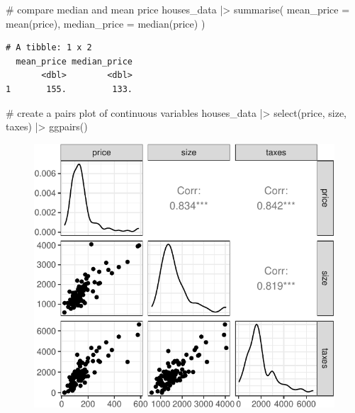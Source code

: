 \documentclass[
  11pt,
  letterpaper,
  oneside]{book}
\newenvironment{Shaded}{\begin{snugshade}}{\end{snugshade}}
\newcommand{\AttributeTok}[1]{\textcolor[rgb]{0.40,0.45,0.13}{#1}}
\newcommand{\CommentTok}[1]{\textcolor[rgb]{0.37,0.37,0.37}{#1}}
\newcommand{\FunctionTok}[1]{\textcolor[rgb]{0.28,0.35,0.67}{#1}}
\newcommand{\NormalTok}[1]{\textcolor[rgb]{0.00,0.23,0.31}{#1}}
\newcommand{\SpecialCharTok}[1]{\textcolor[rgb]{0.37,0.37,0.37}{#1}}
\theoremstyle{definition}
\theoremstyle{plain}
\theoremstyle{plain}
\theoremstyle{plain}
\theoremstyle{remark}
\begin{document}
\begin{Shaded}
\begin{Highlighting}[]
\CommentTok{\# compare median and mean price}
\NormalTok{houses\_data }\SpecialCharTok{|\textgreater{}}
  \FunctionTok{summarise}\NormalTok{(}
    \AttributeTok{mean\_price =} \FunctionTok{mean}\NormalTok{(price),}
    \AttributeTok{median\_price =} \FunctionTok{median}\NormalTok{(price)}
\NormalTok{  )}
\end{Highlighting}
\end{Shaded}

\begin{verbatim}
# A tibble: 1 x 2
  mean_price median_price
       <dbl>        <dbl>
1       155.         133.
\end{verbatim}

\begin{Shaded}
\begin{Highlighting}[]
\CommentTok{\# create a pairs plot of continuous variables}
\NormalTok{houses\_data }\SpecialCharTok{|\textgreater{}}
  \FunctionTok{select}\NormalTok{(price, size, taxes) }\SpecialCharTok{|\textgreater{}}
  \FunctionTok{ggpairs}\NormalTok{()}
\end{Highlighting}
\end{Shaded}

\begin{figure}[H]

{\centering \includegraphics{r-demo-part-2_files/figure-pdf/unnamed-chunk-5-1.pdf}

}

\end{figure}
\end{document}

